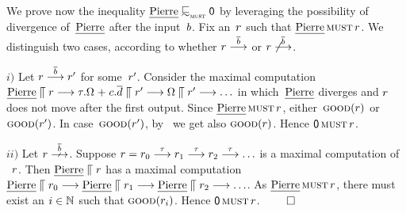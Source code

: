 \begin{example}
  \label{ex:p-testleqS-Nil}
  We prove now the inequality $\pierre \testleqS \Nil$ by leveraging %
    the possibility of divergence of~$\text{{\em Pierre}}$
after the input~$b$.
Fix an~$r$ such that $ \text{{\em Pierre}} \operatorname{\textsc{must}} r $. We
distinguish two cases, according to whether $r \mathrel{\overset{ \overline{b}}\longrightarrow}$
or $r \not \mathrel{\overset{ \overline{b}}\longrightarrow}$.


$i)$ %
Let $r \mathrel{\overset{ \overline{b}}\longrightarrow} r'$ for some~$r'$.
Consider the maximal computation
$ \text{{\em Pierre}}  \mathrel{\llceil} r \mathrel{\overset{}\longrightarrow} \tau.\Omega \mathrel{+}
  c.\overline{d} \mathrel{\llceil} r' \mathrel{\overset{}\longrightarrow} \Omega \mathrel{\llceil} r' \mathrel{\overset{}\longrightarrow}
\ldots $ in which~$\text{{\em Pierre}}$ diverges and $r$ does not move after
the first output.  Since $\text{{\em Pierre}} \operatorname{\textsc{must}} r$,
either~$\textsc{good}(r)$ or $\textsc{good}(r')$. In
case~$\textsc{good}(r')$, by~ we get also
$\textsc{good}(r)$. Hence $ \Must{\Nil}{\client}$.

$ ii)$ Let $\client \Nst{\co{b}}$.
Suppose $r = r_0 \mathrel{\overset{\tau}\longrightarrow} r_1
  \mathrel{\overset{\tau}\longrightarrow} r_2 \mathrel{\overset{\tau}\longrightarrow} \ldots$ is a maximal computation of
  ~$r$.
  Then %
  $\text{{\em Pierre}}  \mathrel{\llceil} r$ has a maximal computation $
\text{{\em Pierre}} \mathrel{\llceil} r_0 \mathrel{\overset{}\longrightarrow}
\text{{\em Pierre}} \mathrel{\llceil} r_1 \mathrel{\overset{}\longrightarrow}
\text{{\em Pierre}} \mathrel{\llceil} r_2 \mathrel{\overset{}\longrightarrow}\ldots$.
As $\text{{\em Pierre}} \operatorname{\textsc{must}} r$,
there must exist an $i \in \mathbb{N}_{}$ such that $\good{\client_i}$. Hence
$ \Must{\Nil}{\client}$.
\hfill$\qed$
%
%


\end{example}
